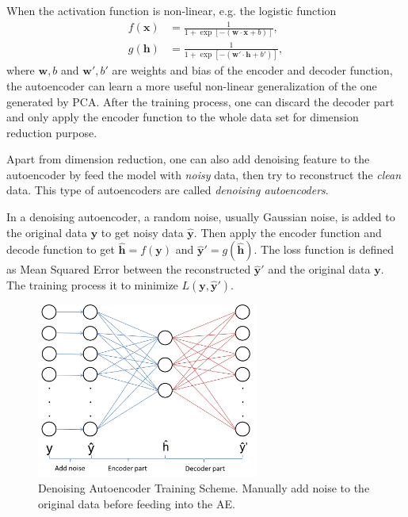 \documentclass[11pt,a4paper]{article}
\theoremstyle{definition}
\numberwithin{equation}{section}
\let\vec\mathbf
\begin{document}
	
	When the activation function is non-linear, e.g. the logistic function
	\begin{equation}
	\begin{split}
	f(\vec x) &= \frac{1}{1+\exp[-(\vec w\cdot\vec x + b)]},\\
	g(\vec h) &= \frac{1}{1+\exp[-(\vec w'\cdot\vec h + b')]},
	\end{split}
	\end{equation}
	where $\vec w, b$ and $\vec w', b'$ are weights and bias of the encoder and decoder function, the autoencoder can learn a more useful non-linear generalization of the one generated by PCA. 
	After the training process, one can discard the decoder part and only apply the encoder function to the whole data set for dimension reduction purpose.
	
	
	
	Apart from dimension reduction, one can also add denoising feature to the autoencoder by feed the model with \textit{noisy} data, then try to reconstruct the \textit{clean} data. This type of autoencoders are called \textit{denoising autoencoders}. 
	
	In a denoising autoencoder, a random noise, usually Gaussian noise, is added to the original data $\vec y$ to get noisy data $\hat{\vec y}$. Then apply the encoder function and decode function to get $\hat{\vec h} = f(\vec y)$  and $\vec{\hat y'} = g(\hat{\vec h})$. The loss function is defined as Mean Squared Error between the reconstructed $\vec{\hat y'}$ and the original data $\vec y$. The training process it to minimize $L(\vec y,\vec{\hat y'})$. 
	
	\begin{figure}[h!]
		\centering
		\includegraphics[width=0.65\textwidth]{dae.png}
		\caption{Denoising Autoencoder Training Scheme. Manually add noise to the original data before feeding into the AE.}
	\end{figure}
	
\end{document}
